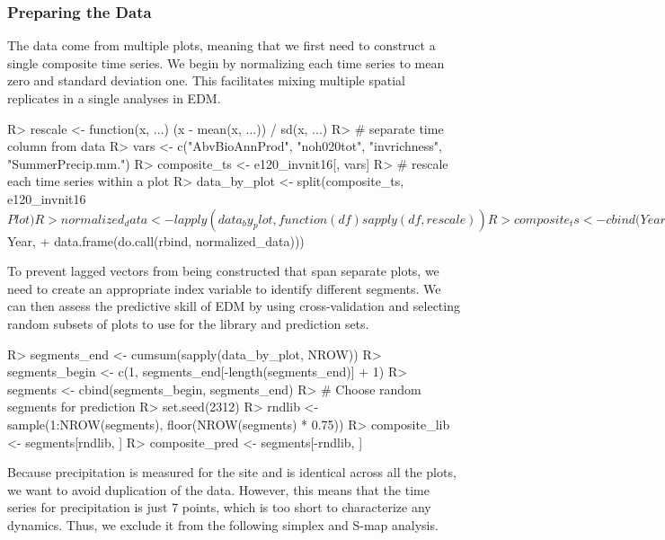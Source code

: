 \documentclass[article]{jss}
\begin{document}
\subsubsection{Preparing the Data}\label{sec:e120-data-prep}

The data come from multiple plots, meaning that we first need to construct a single composite time series. We begin by normalizing each time series to mean zero and standard deviation one. This facilitates mixing multiple spatial replicates in a single analyses in EDM.

\begin{Schunk}
\begin{Sinput}
R> rescale <- function(x, ...) {(x - mean(x, ...)) / sd(x, ...)}
R> # separate time column from data
R> vars <- c("AbvBioAnnProd", "noh020tot", "invrichness", "SummerPrecip.mm.")
R> composite_ts <- e120_invnit16[, vars]
R> # rescale each time series within a plot
R> data_by_plot <- split(composite_ts, e120_invnit16$Plot)
R> normalized_data <- lapply(data_by_plot, function(df) sapply(df, rescale))
R> composite_ts <- cbind(Year = e120_invnit16$Year,
+                        data.frame(do.call(rbind, normalized_data)))
\end{Sinput}
\end{Schunk}

To prevent lagged vectors from being constructed that span separate plots, we need to create an appropriate index variable to identify different segments. We can then assess the predictive skill of EDM by using cross-validation and selecting random subsets of plots to use for the library and prediction sets.

\begin{Schunk}
\begin{Sinput}
R> segments_end <- cumsum(sapply(data_by_plot, NROW))
R> segments_begin <- c(1, segments_end[-length(segments_end)] + 1)
R> segments <- cbind(segments_begin, segments_end)
R> # Choose random segments for prediction
R> set.seed(2312)
R> rndlib <- sample(1:NROW(segments), floor(NROW(segments) * 0.75))
R> composite_lib <- segments[rndlib, ]
R> composite_pred <- segments[-rndlib, ]
\end{Sinput}
\end{Schunk}

Because precipitation is measured for the site and is identical across all the plots, we want to avoid duplication of the data. However, this means that the time series for precipitation is just 7 points, which is too short to characterize any dynamics. Thus, we exclude it from the following simplex and S-map analysis.
\end{document}
